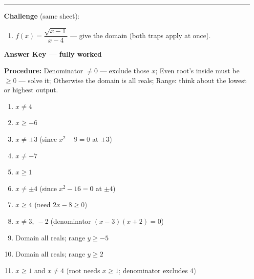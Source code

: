 \documentclass[12pt]{article}
\begin{document}
\vspace{0.2cm}\hrule\vspace{0.3cm}
\textbf{Challenge} (same sheet):\\[4pt]
\begin{enumerate}[label=\textbf{\arabic*.}, start=11, itemsep=2.2cm]
  \item $f(x)=\dfrac{\sqrt{x-1}}{x-4}$ --- give the domain (both traps apply at once).
\end{enumerate}

\newpage

\begin{center}{\Large \textbf{Answer Key --- fully worked}}\end{center}
\vspace{0.25cm}
\textbf{Procedure:} Denominator $\ne 0$ --- exclude those $x$; Even root's inside must be $\ge 0$ --- solve it; Otherwise the domain is all reals; Range: think about the lowest or highest output.\\[8pt]
\begin{enumerate}[label=\textbf{\arabic*.},itemsep=7pt]
  \item $x\ne 4$
  \item $x\ge -6$
  \item $x\ne \pm 3$ (since $x^{2}-9=0$ at $\pm 3$)
  \item $x\ne -7$
  \item $x\ge 1$
  \item $x\ne \pm 4$ (since $x^{2}-16=0$ at $\pm 4$)
  \item $x\ge 4$ (need $2x-8\ge 0$)
  \item $x\ne 3,\ -2$ (denominator $(x-3)(x+2)=0$)
  \item Domain all reals; range $y\ge -5$
  \item Domain all reals; range $y\ge 2$
  \item $x\ge 1$ and $x\ne 4$ (root needs $x\ge 1$; denominator excludes 4)
\end{enumerate}
\end{document}
